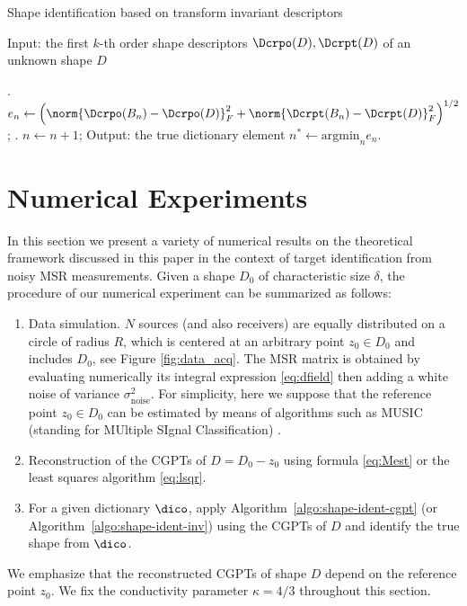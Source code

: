 \begin{algorithm}
  \caption{Shape identification based on transform invariant descriptors}
  \label{algo:shape-ident-inv}
  \begin{algorithmic}
    \STATE Input: the first $k$-th order shape descriptors $\Dcrpo(D), \Dcrpt(D)$ of an unknown shape $D$

    .
    $e_n\leftarrow \left(\norm{\Dcrpo(B_n) - \Dcrpo(D)}_F^2 + \norm{\Dcrpt(B_n) -
    \Dcrpt(D)}_F^2\right)^{1/2}$;
    . $n\leftarrow n+1$;
    \ENDFOR
    \STATE Output: the true dictionary element $n^*\leftarrow \mbox{argmin}_n
    e_n$.
  \end{algorithmic}
\end{algorithm}


\section{Numerical Experiments} \label{sec:numer-exper}

In this section we present a variety of numerical results on the
theoretical framework discussed in this paper in the context of
target identification from noisy MSR  measurements. Given a shape
$D_0$ of characteristic size $\delta$, the procedure of our
numerical experiment can be summarized as follows:
\begin{enumerate}
\item Data simulation. $N$ sources (and also receivers) are
equally
  distributed on a circle of radius $R$, which is centered at an
  arbitrary point $z_0\in D_0$ and includes $D_0$, see Figure
  \ref{fig:data_acq}. The MSR matrix is obtained by evaluating
  numerically its integral expression \eqref{eq:dfield} then adding a
  white noise of variance $\sigma_{\mathrm{noise}}^2$. For simplicity, here
  we suppose that the reference point $z_0\in D_0$ can be estimated by
  means of  algorithms such as MUSIC (standing for MUltiple SIgnal Classification) \cite{AGJ, ammari2007polarization}.
\item Reconstruction of the CGPTs of $D=D_0-z_0$ using formula
  \eqref{eq:Mest} or the least squares algorithm \eqref{eq:lsqr}.
\item For a given dictionary $\dico$, apply
  Algorithm~\ref{algo:shape-ident-cgpt} (or
  Algorithm~\ref{algo:shape-ident-inv}) using the CGPTs of $D$ and
  identify the true shape from $\dico$.
\end{enumerate}
We emphasize that the reconstructed CGPTs of shape $D$ depend on
the reference point $z_0$. We fix the conductivity parameter
$\kappa=4/3$ throughout this section.


